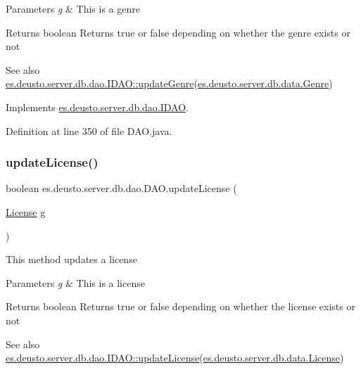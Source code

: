\begin{DoxyParams}{Parameters}
{\em g} & This is a genre \\
\hline
\end{DoxyParams}
\begin{DoxyReturn}{Returns}
boolean Returns true or false depending on whether the genre exists or not 
\end{DoxyReturn}
\begin{DoxySeeAlso}{See also}
\hyperlink{interfacees_1_1deusto_1_1server_1_1db_1_1dao_1_1_i_d_a_o_ae989ff2681d6afe8651a595340265c39}{es.\+deusto.\+server.\+db.\+dao.\+I\+D\+A\+O\+::update\+Genre}(\hyperlink{classes_1_1deusto_1_1server_1_1db_1_1data_1_1_genre}{es.\+deusto.\+server.\+db.\+data.\+Genre}) 
\end{DoxySeeAlso}


Implements \hyperlink{interfacees_1_1deusto_1_1server_1_1db_1_1dao_1_1_i_d_a_o_ae989ff2681d6afe8651a595340265c39}{es.\+deusto.\+server.\+db.\+dao.\+I\+D\+AO}.



Definition at line 350 of file D\+A\+O.\+java.

\mbox{\label{classes_1_1deusto_1_1server_1_1db_1_1dao_1_1_d_a_o_a98774e8d93cdd4d8d104a197bd37d4e1}} 
\subsubsection{\texorpdfstring{update\+License()}{updateLicense()}}
{\footnotesize\ttfamily boolean es.\+deusto.\+server.\+db.\+dao.\+D\+A\+O.\+update\+License (\begin{DoxyParamCaption}\item[{\hyperlink{classes_1_1deusto_1_1server_1_1db_1_1data_1_1_license}{License}}]{g }\end{DoxyParamCaption})}

This method updates a license 
\begin{DoxyParams}{Parameters}
{\em g} & This is a license \\
\hline
\end{DoxyParams}
\begin{DoxyReturn}{Returns}
boolean Returns true or false depending on whether the license exists or not 
\end{DoxyReturn}
\begin{DoxySeeAlso}{See also}
\hyperlink{interfacees_1_1deusto_1_1server_1_1db_1_1dao_1_1_i_d_a_o_a601329b95123948b10c3232687b11d5b}{es.\+deusto.\+server.\+db.\+dao.\+I\+D\+A\+O\+::update\+License}(\hyperlink{classes_1_1deusto_1_1server_1_1db_1_1data_1_1_license}{es.\+deusto.\+server.\+db.\+data.\+License}) 
\end{DoxySeeAlso}


